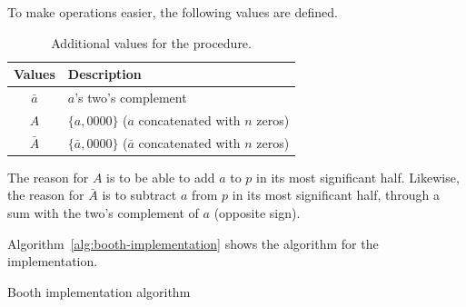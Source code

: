 \documentclass[titlepage]{article}
\begin{document}
To make operations easier, the following values are defined.\par

\begin{table}[ht]
    \caption{Additional values for the procedure.}
    \label{tab:values}
    \centering
    \begin{tabular}{cl}
        \toprule
        Values & Description \\
        \midrule
        $\bar{a}$ & $a$'s two's complement \\
        $A$       & $ \{ a , 0000 \}$ ($a$ concatenated with $n$ zeros) \\
        $\bar{A}$ & $ \{ \bar{a} , 0000 \}$ ($\bar{a}$ concatenated with $n$ zeros) \\
        \bottomrule
    \end{tabular}
\end{table}

The reason for $A$ is to be able to add $a$ to $p$ in its most significant half.
Likewise, the reason for $\bar{A}$ is to subtract $a$ from $p$ in its most significant half, through a sum with the two's complement of $a$ (opposite sign).\par

Algorithm~\ref{alg:booth-implementation} shows the algorithm for the implementation.

\begin{algorithm}
    \caption{Booth implementation algorithm}
    \label{alg:booth-implementation}
    \begin{algorithmic}[1]
                \EndCase
                \EndCase
                \EndCase
                \EndCase
            \EndSwitch
        \EndFor
    \end{algorithmic}
\end{algorithm}
\end{document}
